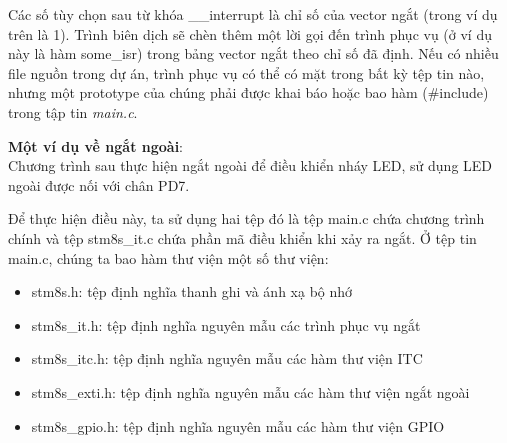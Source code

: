 Các số tùy chọn sau từ khóa \_\_interrupt là chỉ số của vector ngắt (trong ví dụ trên là 1).
Trình biên dịch sẽ chèn thêm một lời gọi đến trình phục vụ (ở ví dụ này là hàm some\_isr) trong bảng vector ngắt theo chỉ số đã định.
Nếu có nhiều file nguồn trong dự án, trình phục vụ có thể có mặt trong bất kỳ tệp tin nào, nhưng một prototype của chúng phải được khai báo hoặc bao hàm (\#include) trong tập tin \emph{main.c}.

\textbf{Một ví dụ về ngắt ngoài}:\\
Chương trình sau thực hiện ngắt ngoài để điều khiển nháy LED, sử dụng LED ngoài được nối với chân PD7.

Để thực hiện điều này, ta sử dụng hai tệp đó là tệp main.c chứa chương trình chính và tệp stm8s\_it.c chứa phần mã điều khiển khi xảy ra ngắt.
Ở tệp tin main.c, chúng ta bao hàm thư viện một số thư viện:
\begin{itemize}
\item stm8s.h: tệp định nghĩa thanh ghi và ánh xạ bộ nhớ
\item stm8s\_it.h: tệp định nghĩa nguyên mẫu các trình phục vụ ngắt
\item stm8s\_itc.h: tệp định nghĩa nguyên mẫu các hàm thư viện ITC
\item stm8s\_exti.h: tệp định nghĩa nguyên mẫu các hàm thư viện ngắt ngoài
\item stm8s\_gpio.h: tệp định nghĩa nguyên mẫu các hàm thư viện GPIO
\end{itemize}

